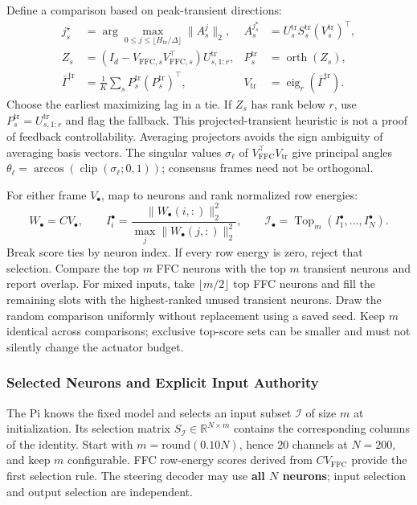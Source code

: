Define a comparison based on peak-transient directions:
\begin{align}
 j_s^\star&=\arg\max_{0\le j\le\lfloor H_{\mathrm{tr}}/\Delta\rfloor}\|A_s^j\|_2,
 &A_s^{j_s^\star}&=U_s^{\mathrm{tr}}S_s^{\mathrm{tr}}(V_s^{\mathrm{tr}})^{\top},\\
 Z_s&=(I_d-V_{\mathrm{FFC},s}V_{\mathrm{FFC},s}^{\top})U_{s,1:r}^{\mathrm{tr}},
 &P_s^{\mathrm{tr}}&=\operatorname{orth}(Z_s),\\
 \bar\Gamma^{\mathrm{tr}}&=\frac1K\sum_sP_s^{\mathrm{tr}}(P_s^{\mathrm{tr}})^{\top},
 &V_{\mathrm{tr}}&=\operatorname{eig}_r(\bar\Gamma^{\mathrm{tr}}).
 \label{eq:transient-selection}
\end{align}
Choose the earliest maximizing lag in a tie. If $Z_s$ has rank below $r$, use $P_s^{\mathrm{tr}}=U_{s,1:r}^{\mathrm{tr}}$ and flag the fallback. This projected-transient heuristic is not a proof of feedback controllability. Averaging projectors avoids the sign ambiguity of averaging basis vectors. The singular values $\sigma_\ell$ of $V_{\mathrm{FFC}}^{\top}V_{\mathrm{tr}}$ give principal angles $\theta_\ell=\arccos(\operatorname{clip}(\sigma_\ell;0,1))$; consensus frames need not be orthogonal.

For either frame $V_\bullet$, map to neurons and rank normalized row energies:
\begin{equation}
 W_\bullet=CV_\bullet,\qquad
 I_i^\bullet=\frac{\|W_\bullet(i,:)\|_2^2}
 {\max_j\|W_\bullet(j,:)\|_2^2},\qquad
 \mathcal I_\bullet=\operatorname{Top}_m(I_1^\bullet,\ldots,I_N^\bullet).
 \label{eq:neuron-ranking}
\end{equation}
Break score ties by neuron index. If every row energy is zero, reject that selection. Compare the top $m$ FFC neurons with the top $m$ transient neurons and report overlap. For mixed inputs, take $\lfloor m/2\rfloor$ top FFC neurons and fill the remaining slots with the highest-ranked unused transient neurons. Draw the random comparison uniformly without replacement using a saved seed. Keep $m$ identical across comparisons; exclusive top-score sets can be smaller and must not silently change the actuator budget.

\subsubsection{Selected Neurons and Explicit Input Authority}
The Pi knows the fixed model and selects an input subset $\mathcal I$ of size $m$ at initialization. Its selection matrix $S_{\mathcal I}\in\mathbb{R}^{N\times m}$ contains the corresponding columns of the identity. Start with $m=\mathrm{round}(0.10N)$, hence 20 channels at $N=200$, and keep $m$ configurable. FFC row-energy scores derived from $CV_{\mathrm{FFC}}$ provide the first selection rule. The steering decoder may use \textbf{all $N$ neurons}; input selection and output selection are independent.

